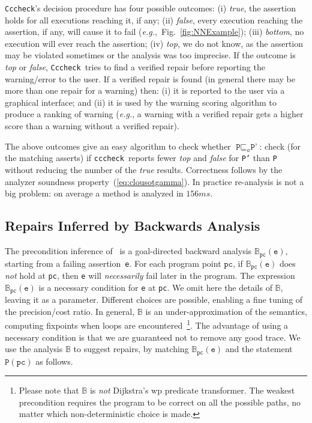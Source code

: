\documentclass[10pt]{sigplanconf}
\newcommand{\refFig}[1]{Fig.~\ref{fig:#1}}
\newcommand{\code}[1]{\texttt{#1}}
\newcommand{\clousot}{\code{cccheck}}
\newcommand{\Clousot}{\code{Cccheck}}
\begin{document}
\Clousot's decision procedure has four possible outcomes: (i)
\emph{true}, the assertion holds for all executions reaching it,
if any; (ii) \emph{false}, every execution reaching the assertion, if
any, will cause it to fail (\emph{e.g.},~\refFig{NNExample}); (iii)
\emph{bottom}, no execution will ever reach the assertion; (iv)
\emph{top}, we do not know, as the assertion may be violated sometimes
or the analysis was too imprecise.  If the outcome is
\emph{top} or \emph{false}, \Clousot\ tries to find a verified repair
before reporting the warning/error to the user.
If a verified repair is found (in general there may be more than one repair for a warning) then: (i) it is reported to the user via a graphical interface; and (ii) it is used by the warning scoring algorithm to produce a ranking of warning (\emph{e.g.}, a warning with a verified repair gets a higher score than a warning without a verified repair).

The above outcomes give an easy algorithm to check whether $\code{P}
\sqsubseteq_a \code{P'}$: check (for the matching asserts) if
\clousot\ reports fewer \emph{top} and \emph{false} for \code{P'} than
\code{P} without reducing the number of the \emph{true} results.
Correctness follows by the analyzer soundness property~(\ref{eq:clousotgamma}).
In practice re-analysis is not a big problem: on average a method is analyzed in $156ms$.

\subsection{Repairs Inferred by Backwards Analysis}

The precondition inference of~\cite{CousotCousotLogozzo-VMCAI11} is a
goal-directed backward analysis $\mathbb{B}_{\code{pc}}(\code{e})$,
starting from a failing assertion~\code{e}.  For each program point
$\code{pc}$, if $\mathbb{B}_{\code{pc}}(\code{e})$
does \emph{not} hold at \code{pc}, then \code{e} will
\emph{necessarily} fail later in the program.  The expression
$\mathbb{B}_{\code{pc}}(\code{e})$ is a necessary condition for
\code{e} at \code{pc}.  We omit here the details of $\mathbb{B}$,
leaving it as a parameter.  Different choices are possible, enabling a
fine tuning of the precision/cost ratio.  In general, $\mathbb{B}$ is
an under-approximation of the semantics, computing fixpoints when
loops are encountered~\footnote{Please note that $\mathbb{B}$ is \emph{not} Dijkstra's wp predicate transformer. 
The weakest precondition requires the program to be correct on all the possible paths, no matter which non-deterministic choice is made.}. 
The advantage of using a necessary condition is that we are guaranteed not to remove any good trace.
 We use the analysis $\mathbb{B}$ to suggest
repairs, by matching $\mathbb{B}_{\code{pc}}(\code{e})$ and the
statement $\code{P}(\code{pc})$ as follows.
\end{document}
